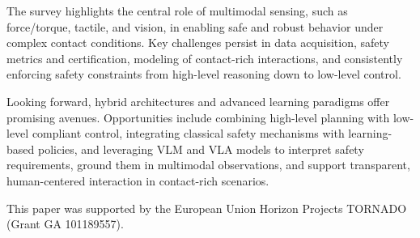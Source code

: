 \documentclass[Afour,sageh,times]{template/sagej}
\newcommand\BibTeX{{\rmfamily B\kern-.05em \textsc{i\kern-.025em b}\kern-.08em
T\kern-.1667em\lower.7ex\hbox{E}\kern-.125emX}}
\begin{document}
The survey highlights the central role of multimodal sensing, such as force/torque, tactile, and vision, in enabling safe and robust behavior under complex contact conditions. Key challenges persist in data acquisition, safety metrics and certification, modeling of contact-rich interactions, and consistently enforcing safety constraints from high-level reasoning down to low-level control.

Looking forward, hybrid architectures and advanced learning paradigms offer promising avenues. Opportunities include combining high-level planning with low-level compliant control, integrating classical safety mechanisms with learning-based policies, and leveraging VLM and VLA models to interpret safety requirements, ground them in multimodal observations, and support transparent, human-centered interaction in contact-rich scenarios.





% 
% 
% 

%


\begin{acks}
This paper was supported by the European Union Horizon Projects TORNADO (Grant GA 101189557).
\end{acks}



\end{document}
